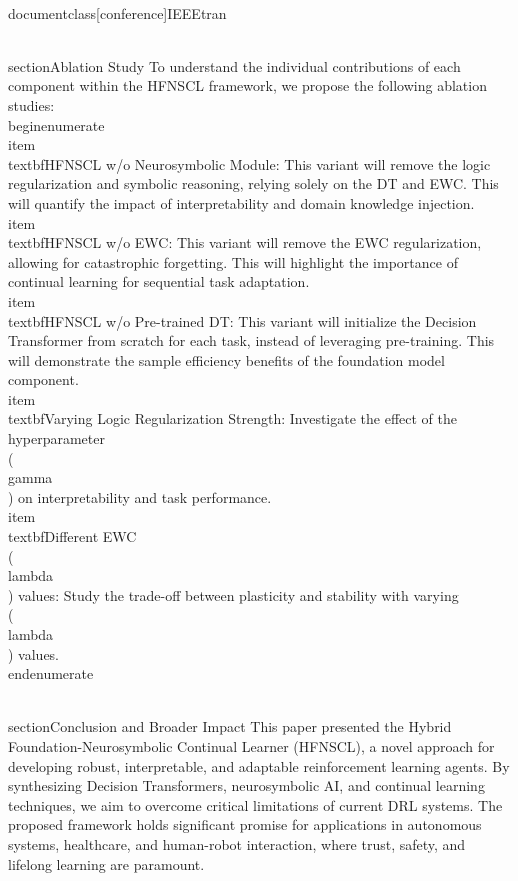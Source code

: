 \\documentclass[conference]{IEEEtran}
\begin{document}
\\section{Ablation Study}
To understand the individual contributions of each component within the HFNSCL framework, we propose the following ablation studies:
\\begin{enumerate}
    \\item \\textbf{HFNSCL w/o Neurosymbolic Module}: This variant will remove the logic regularization and symbolic reasoning, relying solely on the DT and EWC. This will quantify the impact of interpretability and domain knowledge injection.
    \\item \\textbf{HFNSCL w/o EWC}: This variant will remove the EWC regularization, allowing for catastrophic forgetting. This will highlight the importance of continual learning for sequential task adaptation.
    \\item \\textbf{HFNSCL w/o Pre-trained DT}: This variant will initialize the Decision Transformer from scratch for each task, instead of leveraging pre-training. This will demonstrate the sample efficiency benefits of the foundation model component.
    \\item \\textbf{Varying Logic Regularization Strength}: Investigate the effect of the hyperparameter \\(\\gamma\\) on interpretability and task performance.
    \\item \\textbf{Different EWC \\(\\lambda\\) values}: Study the trade-off between plasticity and stability with varying \\(\\lambda\\) values.
\\end{enumerate}

\\section{Conclusion and Broader Impact}
This paper presented the Hybrid Foundation-Neurosymbolic Continual Learner (HFNSCL), a novel approach for developing robust, interpretable, and adaptable reinforcement learning agents. By synthesizing Decision Transformers, neurosymbolic AI, and continual learning techniques, we aim to overcome critical limitations of current DRL systems. The proposed framework holds significant promise for applications in autonomous systems, healthcare, and human-robot interaction, where trust, safety, and lifelong learning are paramount.
\end{document}
